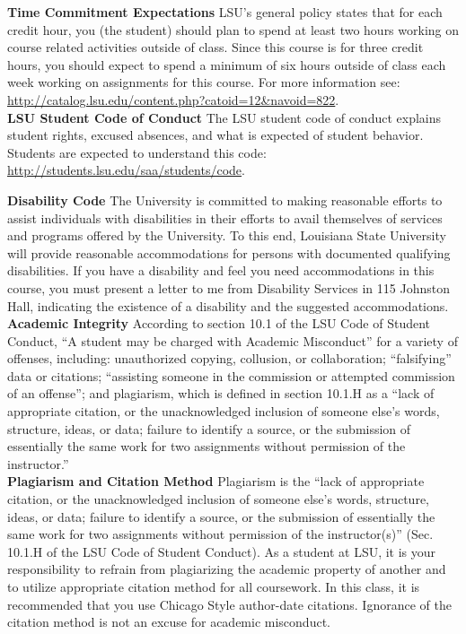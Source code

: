 \documentclass[11pt,article,oneside]{memoir}
\begin{document}
\noindent \textbf{Time Commitment Expectations}
LSU's general policy states that for each credit hour, you (the student) should plan to
spend at least two hours working on course related activities outside of class. Since this course is for three credit hours, you should expect to spend a minimum of six hours outside of class each week working on assignments for this course. For more information see:
\url{http://catalog.lsu.edu/content.php?catoid=12&navoid=822}.\\

\noindent \textbf{LSU Student Code of Conduct}
The LSU student code of conduct explains student rights, excused absences, and what is expected of student behavior. Students are expected to understand this code:  \url{http://students.lsu.edu/saa/students/code}.\\ %

\clearpage

\noindent \textbf{Disability Code}
The University is committed to making reasonable efforts to assist individuals with disabilities in
their efforts to avail themselves of services and programs offered by the University. To this end,
Louisiana State University will provide reasonable accommodations for persons with
documented qualifying disabilities. If you have a disability and feel you need accommodations in
this course, you must present a letter to me from Disability Services in 115 Johnston Hall,
indicating the existence of a disability and the suggested accommodations.\\

\noindent \textbf{Academic Integrity}
According to section 10.1 of the LSU Code of Student Conduct, ``A student may be charged with Academic Misconduct'' for a variety of offenses, including: unauthorized copying, collusion, or collaboration; ``falsifying'' data or citations; ``assisting someone in the commission or attempted commission of an offense''; and plagiarism, which is defined in section 10.1.H as a ``lack of appropriate citation, or the unacknowledged inclusion of someone else's words, structure, ideas, or data; failure to identify a source, or the submission of essentially the same work for two assignments without permission of the instructor.''\\

\noindent \textbf{Plagiarism and Citation Method}
Plagiarism is the ``lack of appropriate citation, or the unacknowledged inclusion of someone else's words, structure, ideas, or data; failure to identify a source, or the submission of essentially the same work for two assignments without permission of the instructor(s)'' (Sec. 10.1.H of the LSU Code of Student Conduct). As a student at LSU, it is your responsibility to refrain from plagiarizing the academic property of another and to utilize appropriate citation method for all coursework. In this class, it is recommended that you use Chicago Style author-date citations. Ignorance of the citation method is not an excuse for academic misconduct.
\end{document}
